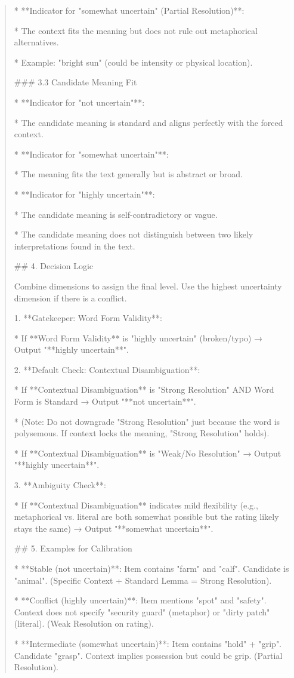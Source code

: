 \begin{quote}
*   **Indicator for "somewhat uncertain" (Partial Resolution)**:

    *   The context fits the meaning but does not rule out metaphorical alternatives.

    *   Example: "bright sun" (could be intensity or physical location).



### 3.3 Candidate Meaning Fit

*   **Indicator for "not uncertain"**:

    *   The candidate meaning is standard and aligns perfectly with the forced context.

*   **Indicator for "somewhat uncertain"**:

    *   The meaning fits the text generally but is abstract or broad.

*   **Indicator for "highly uncertain"**:

    *   The candidate meaning is self-contradictory or vague.

    *   The candidate meaning does not distinguish between two likely interpretations found in the text.



## 4. Decision Logic



Combine dimensions to assign the final level. Use the highest uncertainty dimension if there is a conflict.



1.  **Gatekeeper: Word Form Validity**:

    *   If **Word Form Validity** is "highly uncertain" (broken/typo) → Output "**highly uncertain**".

2.  **Default Check: Contextual Disambiguation**:

    *   If **Contextual Disambiguation** is "Strong Resolution" AND Word Form is Standard → Output "**not uncertain**".

    *   (Note: Do not downgrade "Strong Resolution" just because the word is polysemous. If context locks the meaning, "Strong Resolution" holds).

    *   If **Contextual Disambiguation** is "Weak/No Resolution" → Output "**highly uncertain**".

3.  **Ambiguity Check**:

    *   If **Contextual Disambiguation** indicates mild flexibility (e.g., metaphorical vs. literal are both somewhat possible but the rating likely stays the same) → Output "**somewhat uncertain**".



## 5. Examples for Calibration

*   **Stable (not uncertain)**: Item contains "farm" and "calf". Candidate is "animal". (Specific Context + Standard Lemma = Strong Resolution).

*   **Conflict (highly uncertain)**: Item mentions "spot" and "safety". Context does not specify "security guard" (metaphor) or "dirty patch" (literal). (Weak Resolution on rating).

*   **Intermediate (somewhat uncertain)**: Item contains "hold" + "grip". Candidate "grasp". Context implies possession but could be grip. (Partial Resolution).
\end{quote}
